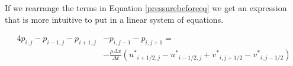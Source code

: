 If we rearrange the terms in Equation \ref{pressurebeforeeq} we get an expression that is more intuitive to put in a linear system of equations.

\begin{equation}
\begin{split}
4p_{i,j} - p_{i-1,j} - p_{i+1,j} & - p_{i,j-1} - p_{i,j+1} = \\ &-\frac{\rho \Delta x}{\Delta t}({u^*}_{i+1/2,j} - {u^*}_{i-1/2,j} + {v^*}_{i,j+1/2} - {v^*}_{i,j-1/2})
\end{split}
\label{pressureeq}
\end{equation}
